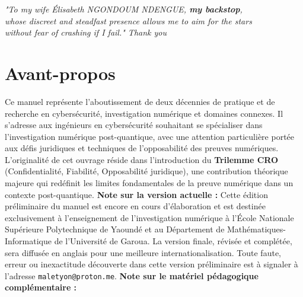 \documentclass[11pt,a4paper,oneside]{book}
\begin{document}
\clearpage  %
\thispagestyle{empty}  %

\begin{center}
    \itshape  %
    "To my wife Élisabeth NGONDOUM NDENGUE, \textbf{my backstop}, \\
    whose discreet and steadfast presence allows me to aim for the stars \\
    without fear of crashing if I fail." Thank you \textcolor{red}{\blackheartsuit}
\end{center}

\clearpage  %

    \frontmatter
        \chapter*{Avant-propos}
            Ce manuel représente l'aboutissement de deux décennies de pratique et de recherche en cybersécurité, investigation numérique et domaines connexes. Il s'adresse aux ingénieurs en cybersécurité souhaitant se spécialiser dans l'investigation numérique post-quantique, avec une attention particulière portée aux défis juridiques et techniques de l'opposabilité des preuves numériques.
            L'originalité de cet ouvrage réside dans l'introduction du \textbf{Trilemme CRO} (Confidentialité, Fiabilité, Opposabilité juridique), une contribution théorique majeure qui redéfinit les limites fondamentales de la preuve numérique dans un contexte post-quantique.
        \vspace{0.5cm}
        \noindent\textbf{Note sur la version actuelle :} Cette édition préliminaire du manuel est encore en cours d'élaboration et est destinée exclusivement à l'enseignement de l'investigation numérique à l'École Nationale Supérieure Polytechnique de Yaoundé et au Département de Mathématiques-Informatique de l'Université de Garoua. La version finale, révisée et complétée, sera diffusée en anglais pour une meilleure internationalisation. Toute faute, erreur ou inexactitude découverte dans cette version préliminaire est à signaler à l'adresse \texttt{maletyon@proton.me}.
        \vspace{0.5cm}
        \noindent\textbf{Note sur le matériel pédagogique complémentaire :}
\end{document}
